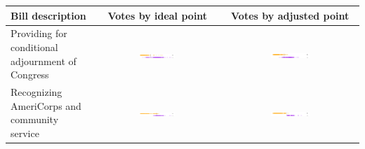 \documentclass{beamer}
\begin{document}
\begin{frame}
\begin{tabular}{|p{3.7cm}|c|c|}
\hline
\textbf{Bill description}
& \textbf{Votes by ideal point}
& \textbf{Votes by adjusted point} \\
\hline
 \small Providing for conditional adjournment of %
 Congress
 & \includegraphics[width=0.3\textwidth]{figs/3397_ideal_point_9.pdf}
 & \includegraphics[width=0.3\textwidth]{figs/3397_adjusted_ideal_point_9.pdf} \\
\hline
\small Recognizing AmeriCorps and community service
& \includegraphics[width=0.3\textwidth]{figs/3397_ideal_point_7.pdf}
& \includegraphics[width=0.3\textwidth]{figs/3397_adjusted_ideal_point_7.pdf} \\

\end{tabular}
\end{frame}
\end{document}
